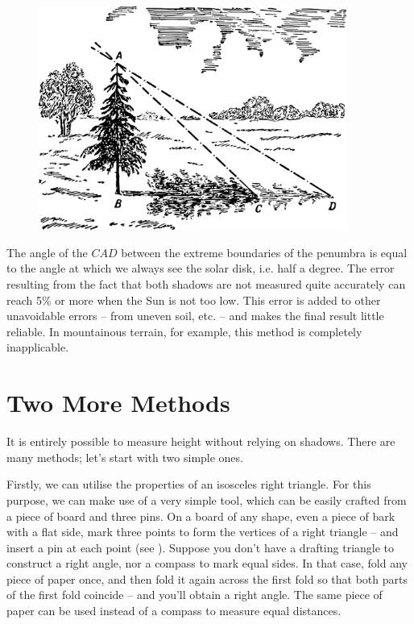 \begin{figure}[h!]
\centering
\includegraphics[width=0.9\textwidth]{figures/ch-01/fig-01-03.pdf}
\end{figure}


The angle of the $CAD$ between the extreme boundaries of the penumbra is equal to the angle at which we always see the solar disk, i.e. half a degree. The error resulting from the fact that both shadows are not measured quite accurately can reach 5\% or more when the Sun is not too low. This error is added to other unavoidable errors -- from uneven soil, etc. -- and makes the final result little reliable. In mountainous terrain, for example, this method is completely inapplicable.

\clearpage

\section{Two More Methods}
\label{sec-1.2}

It is entirely possible to measure height without relying on shadows. There are many methods; let's start with two simple ones.

Firstly, we can utilise the properties of an isosceles right triangle. For this purpose, we can make use of a very simple tool, which can be easily crafted from a piece of board and three pins. On a board of any shape, even a piece of bark with a flat side, mark three points to form the vertices of a right triangle -- and insert a pin at each point (see ). Suppose you don't have a drafting triangle to construct a right angle, nor a compass to mark equal sides. In that case, fold any piece of paper once, and then fold it again across the first fold so that both parts of the first fold coincide -- and you'll obtain a right angle. The same piece of paper can be used instead of a compass to measure equal distances.

